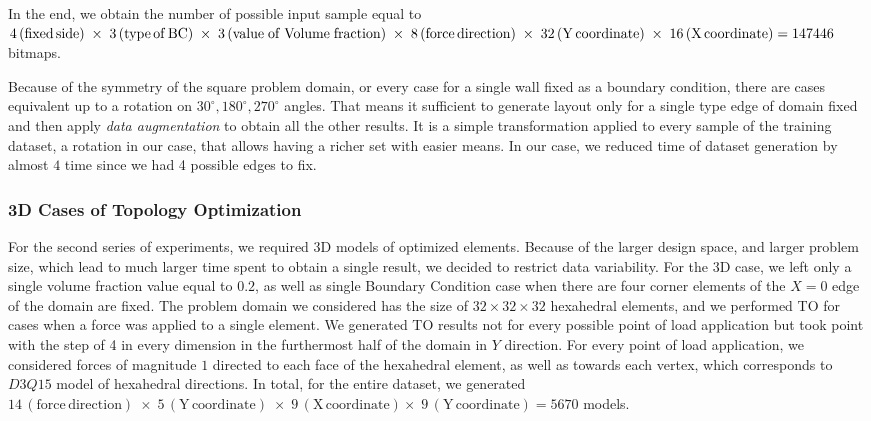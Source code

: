 In the end, we obtain the number of possible input sample equal to $4\,\mathrm{(fixed \, side)} \; \times \; 3\,\mathrm{(type \, of \, BC)} \\ \; \times \; 3\,\mathrm{(value \; of \; Volume \; fraction)} \; \times \; 8\,\mathrm{(force \, direction)} \; \times \; 32\,\mathrm{(Y \, coordinate)} \; \times \; 16\,\mathrm{(X \, coordinate)} = 147446$ bitmaps.
\medskip

Because of the symmetry of the square problem domain, or every case for a single wall fixed as a boundary condition, there are cases equivalent up to a rotation on $30^\circ,180^\circ,270^\circ$ angles.
That means it sufficient to generate layout only for a single type edge of domain fixed and then apply \emph{data augmentation} to obtain all the other results.
It is a simple transformation applied to every sample of the training dataset, a rotation in our case, that allows having a richer set with easier means.
In our case, we reduced time of dataset generation by almost $4$ time since we had 4 possible edges to fix.
\medskip

\subsubsection{3D Cases of Topology Optimization}

For the second series of experiments, we required 3D models of optimized elements.
Because of the larger design space, and larger problem size, which lead to much larger time spent to obtain a single result, we decided to restrict data variability.
For the 3D case, we left only a single volume fraction value equal to $0.2$, as well as single Boundary Condition case when there are four corner elements of the $ X=0 $ edge of the domain are fixed.
The problem domain we considered has the size of $32 \times 32 \times 32$ hexahedral elements, and we performed TO for cases when a force was applied to a single element. 
We generated TO results not for every possible point of load application but took point with the step of 4 in every dimension in the furthermost half of the domain in $Y$ direction. 
For every point of load application, we considered forces of magnitude $1$ directed to each face of the hexahedral element, as well as towards each vertex, which corresponds to $D3Q15$ model of hexahedral directions. 
In total, for the entire dataset, we generated $ 14\,\mathrm{(force \, direction)} \; \times \; 5\,\mathrm{(Y \, coordinate)} \; \times \; 9\,\mathrm{(X \, coordinate)} \times \; 9\,\mathrm{(Y \, coordinate)} = 5670 $ models.
\medskip

